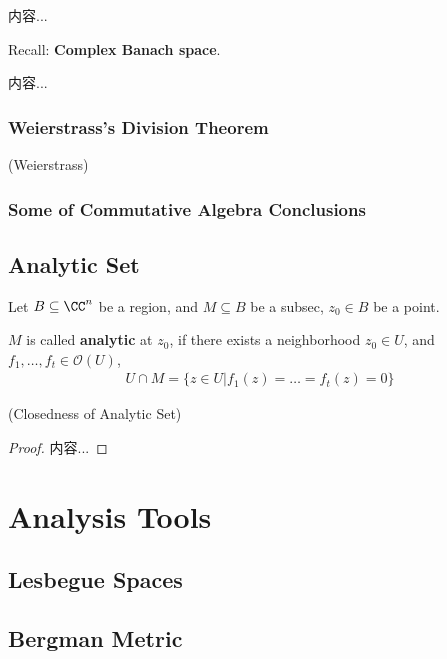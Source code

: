 \documentclass[Total.tex]{subfiles}
\begin{document}
			\begin{Def}
				内容...
			\end{Def}
			
			Recall: \textbf{Complex Banach space}.
			
			\begin{proposition}
				内容...
			\end{proposition}
			
			\subsection{Weierstrass's Division Theorem}
				\begin{theorem}
					(Weierstrass)
				\end{theorem}
			\subsection{Some of Commutative Algebra Conclusions}
			
		\section{Analytic Set}
			\begin{Def}
				Let $B\subseteq \CC^n$ be a region, and $M\subseteq B$ be a subsec, $z_0\in B$ be a point.
				
				$M$ is called \textbf{analytic} at $z_0$, if there exists a neighborhood $z_0\in U$, and $f_1,\dots,f_t\in \mathcal{O}(U)$,
				\begin{gather*}
					U\cap M=\{z\in U|f_1(z)=\dots=f_t(z)=0\}
				\end{gather*}
				
			\end{Def}
			
			\begin{lemma}
				(Closedness of Analytic Set)
			\end{lemma}
			\begin{proof}
				内容...
			\end{proof}
	\chapter{Analysis Tools}
		\section{Lesbegue Spaces}
		\section{Bergman Metric}
\end{document}

